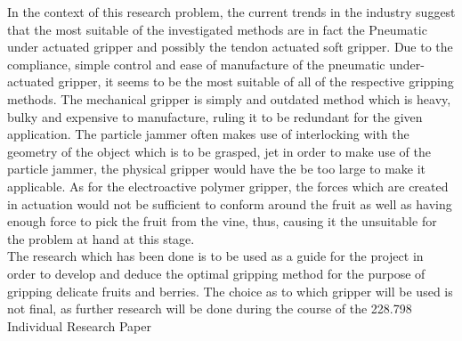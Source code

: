 \documentclass[11pt,twocolumn]{article}
\begin{document}
In the context of this research problem, the current trends in the industry suggest that the most suitable of the investigated methods are in fact the Pneumatic under actuated gripper and possibly the tendon actuated soft gripper. Due to the compliance, simple control and ease of manufacture of the pneumatic under-actuated gripper, it seems to be the most suitable of all of the respective gripping methods. The mechanical gripper is simply and outdated method which is heavy, bulky and expensive to manufacture, ruling it to be redundant for the given application. The particle jammer often makes use of interlocking with the geometry of the object which is to be grasped, jet in order to make use of the particle jammer, the physical gripper would have the be too large to make it applicable. As for the electroactive polymer gripper, the forces which are created in actuation would not be sufficient to conform around the  fruit as well as having enough force to pick the fruit from the vine, thus, causing it the unsuitable for the problem at hand at this stage.
\\
\newline
The research which has been done is to be used as a guide for the project in order to develop and deduce the optimal gripping method for the purpose of gripping delicate fruits and berries. The choice as to which gripper will be used is not final, as further research will be done during the course of the 228.798 Individual Research Paper


\end{document}
